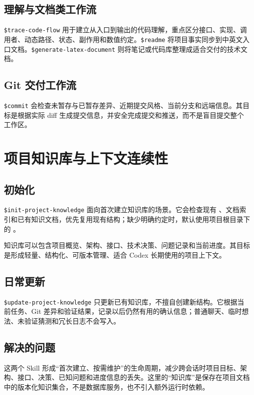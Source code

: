 \documentclass[12pt,a4paper]{article}
\newcommand{\code}[1]{\texttt{\detokenize{#1}}}
\begin{document}
\subsection{理解与文档类工作流}

\texttt{\$trace-code-flow} 用于建立从入口到输出的代码理解，重点区分接口、实现、调用者、动态路径、状态、副作用和数值约定。\texttt{\$readme} 将项目事实同步到中英文入口文档。\texttt{\$generate-latex-document} 则将笔记或代码库整理成适合交付的技术文档。

\subsection{Git 交付工作流}

\texttt{\$commit} 会检查未暂存与已暂存差异、近期提交风格、当前分支和远端信息。其目标是根据实际 diff 生成提交信息，并安全完成提交和推送，而不是盲目提交整个工作区。

\section{项目知识库与上下文连续性}

\subsection{初始化}

\texttt{\$init-project-knowledge} 面向首次建立知识库的场景。它会检查现有 \code{AGENTS.md}、文档索引和已有知识文档，优先复用现有结构；缺少明确约定时，默认使用项目根目录下的 \code{docs/}。

知识库可以包含项目概览、架构、接口、技术决策、问题记录和当前进度。其目标是形成轻量、结构化、可版本管理、适合 Codex 长期使用的项目上下文。

\subsection{日常更新}

\texttt{\$update-project-knowledge} 只更新已有知识库，不擅自创建新结构。它根据当前任务、Git 差异和验证结果，记录以后仍然有用的确认信息；普通聊天、临时想法、未验证猜测和冗长日志不会写入。

\subsection{解决的问题}

这两个 Skill 形成“首次建立、按需维护”的生命周期，减少跨会话时项目目标、架构、接口、决策、已知问题和进度信息的丢失。这里的“知识库”是保存在项目文档中的版本化知识集合，不是数据库服务，也不引入额外运行时依赖。
\end{document}
